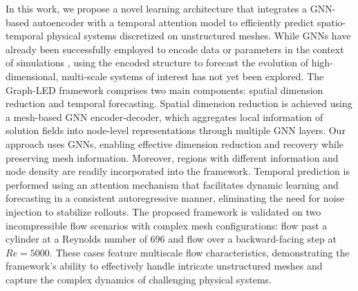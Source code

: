 \documentclass{article}
\begin{document}
In this work, we propose a novel learning architecture that integrates a GNN-based autoencoder with a temporal attention model to efficiently predict spatio-temporal physical systems discretized on unstructured meshes. While GNNs have already been successfully employed to encode data or parameters in the context of simulations \cite{zhang2021eigen,barwey2024scalable,you2024gnumap,barwey2025interpretable}, using the encoded structure to forecast the evolution of high-dimensional, multi-scale systems of interest has not yet been explored. The Graph-LED framework comprises two main components: spatial dimension reduction and temporal forecasting. Spatial dimension reduction is achieved using a mesh-based GNN encoder-decoder, which aggregates local information of solution fields into node-level representations through multiple GNN layers. Our approach uses GNNs, enabling effective dimension reduction and recovery while preserving mesh information. Moreover, regions with different information and node density are readily incorporated into the framework. Temporal prediction is performed using an attention mechanism that facilitates dynamic learning and forecasting in a consistent autoregressive manner, eliminating the need for noise injection to stabilize rollouts. The proposed framework is validated on two incompressible flow scenarios with complex mesh configurations: flow past a cylinder at a Reynolds number of 696 and flow over a backward-facing step at
$Re=5000$. These cases feature multiscale flow characteristics, demonstrating the framework's ability to effectively handle intricate unstructured meshes and capture the complex dynamics of challenging physical systems.
\end{document}
